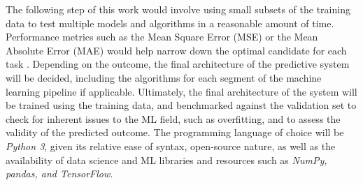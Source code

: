 \documentclass[main.tex]{subfiles}
\begin{document}
The following step of this work would involve using small subsets of the training data to test multiple models and algorithms in a reasonable amount of time. Performance metrics such as the Mean Square Error (MSE) or the Mean Absolute Error (MAE) would help narrow down the optimal candidate for each task \cite{Geron2019}. Depending on the outcome, the final architecture of the predictive system will be decided, including the algorithms for each segment of the machine learning pipeline if applicable. Ultimately, the final architecture of the system will be trained using the training data, and benchmarked against the validation set to check for inherent issues to the ML field, such as overfitting, and to assess the validity of the predicted outcome. The programming language of choice will be \emph{Python 3}, given its relative ease of syntax, open-source nature, as well as the availability of data science and ML libraries and resources such as \emph{NumPy, pandas, and TensorFlow}.


% 
%
%
%
%

\end{document}
